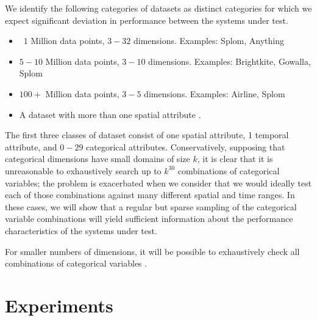 \documentclass[journal]{vgtc}                %
\begin{document}
{We identify the following categories of datasets as distinct categories for which we expect significant deviation in performance between the systems under test. 

\begin{itemize}

	\item ~$1$ Million data points, $3-32$ dimensions. Examples: Splom, Anything

	\item $5-10$ Million data points, $3-10$ dimensions. Examples: Brightkite,
		Gowalla, Splom

	\item $100+$ Million data points, $3-5$ dimensions. Examples: Airline,
		Splom

	\item A dataset with more than one spatial attribute .

\end{itemize}

The first three classes of dataset consist of one spatial attribute, 1 temporal
attribute, and $0-29$ categorical attributes. Conservatively, supposing that
categorical dimensions have small domains of size $k$, it is clear that it is
unreasonable to exhaustively search up to $k^{30}$ combinations of categorical
variables; the problem is exacerbated when we consider that we would ideally
test each of those combinations against many different spatial and time ranges.
In these cases, we will show that a regular but sparse sampling of the
categorical variable combinations will yield sufficient information about the
performance characteristics of the systems under test. 


For smaller numbers of dimensions, it will be possible to exhaustively check all combinations of categorical variables .




\section{Experiments}

}
\end{document}
